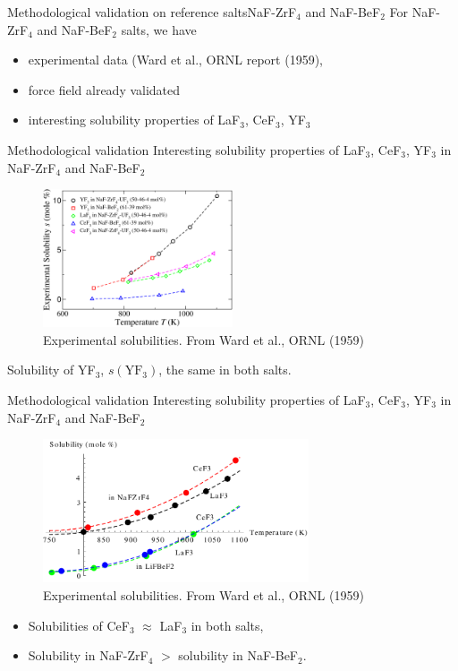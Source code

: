 \documentclass{beamer}
\begin{document}
\begin{frame}{Methodological validation on reference salts}{NaF-ZrF$_4$ and NaF-BeF$_2$}
    For NaF-ZrF$_4$ and NaF-BeF$_2$ salts, we have
    \begin{itemize}
        \item experimental data (Ward et al., ORNL report (1959),
        \item force field already validated
        \item interesting solubility properties of LaF$_3$, CeF$_3$, YF$_3$
    \end{itemize}
\end{frame}

\begin{frame}{Methodological validation}
    Interesting solubility properties of LaF$_3$, CeF$_3$, YF$_3$ in NaF-ZrF$_4$ and NaF-BeF$_2$
    \begin{figure}
        \includegraphics[width=0.5\textwidth]{ward_et_al_solubilities}
        \caption{Experimental solubilities. From Ward et al., ORNL (1959)}
    \end{figure}
    Solubility of YF$_3$, $s(\text{YF}_3)$, the same in both salts.
\end{frame}

\begin{frame}{Methodological validation}
    Interesting solubility properties of LaF$_3$, CeF$_3$, YF$_3$ in NaF-ZrF$_4$ and NaF-BeF$_2$
    \begin{figure}
        \includegraphics[width=0.7\textwidth]{CeF3vsLaF3}
        \caption{Experimental solubilities. From Ward et al., ORNL (1959)}
    \end{figure}
    \begin{itemize}
        \item Solubilities of CeF$_3$ $\approx$ LaF$_3$ in both salts,
        \item Solubility in NaF-ZrF$_4$ $>$ solubility in NaF-BeF$_2$.
    \end{itemize}
\end{frame}
\end{document}
